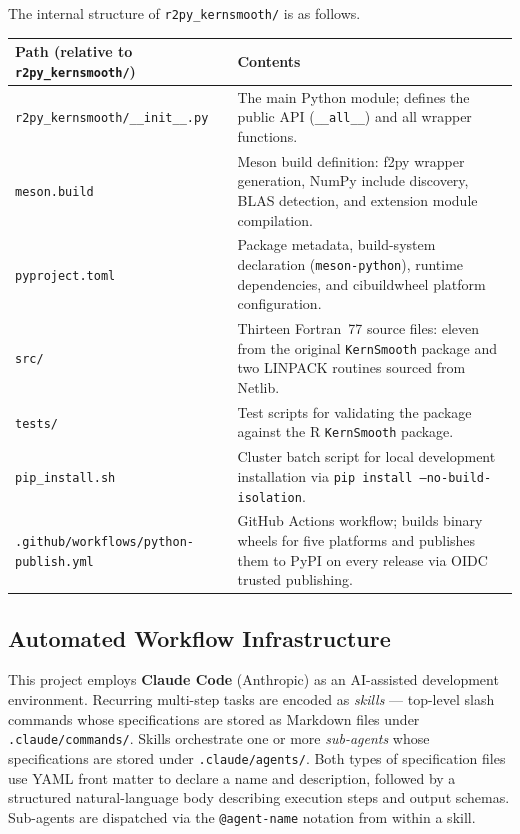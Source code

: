 \documentclass[12pt,a4paper]{article}
\begin{document}
The internal structure of \texttt{r2py\_kernsmooth/} is as follows.

\begin{center}
\begin{tabular}{p{}p{}}
\toprule
Path (relative to \texttt{r2py\_kernsmooth/}) & Contents \\
\midrule
\texttt{r2py\_kernsmooth/\_\_init\_\_.py} &
  The main Python module; defines the public API (\texttt{\_\_all\_\_}) and all wrapper functions. \\
\texttt{meson.build} &
  Meson build definition: f2py wrapper generation, NumPy include discovery, BLAS detection, and extension module compilation. \\
\texttt{pyproject.toml} &
  Package metadata, build-system declaration (\texttt{meson-python}), runtime dependencies, and cibuildwheel platform configuration. \\
\texttt{src/} &
  Thirteen Fortran~77 source files: eleven from the original \texttt{KernSmooth} package and two LINPACK routines sourced from Netlib. \\
\texttt{tests/} &
  Test scripts for validating the package against the R \texttt{KernSmooth} package. \\
\texttt{pip\_install.sh} &
  Cluster batch script for local development installation via \texttt{pip install --no-build-isolation}. \\
\texttt{.github/workflows/python-publish.yml} &
  GitHub Actions workflow; builds binary wheels for five platforms and publishes them to PyPI on every release via OIDC trusted publishing. \\
\bottomrule
\end{tabular}
\end{center}

\subsection{Automated Workflow Infrastructure}

This project employs \textbf{Claude Code} (Anthropic) as an AI-assisted development environment. Recurring multi-step tasks are encoded as \emph{skills} --- top-level slash commands whose specifications are stored as Markdown files under \texttt{.claude/commands/}. Skills orchestrate one or more \emph{sub-agents} whose specifications are stored under \texttt{.claude/agents/}. Both types of specification files use YAML front matter to declare a name and description, followed by a structured natural-language body describing execution steps and output schemas. Sub-agents are dispatched via the \texttt{@agent-name} notation from within a skill.
\end{document}
